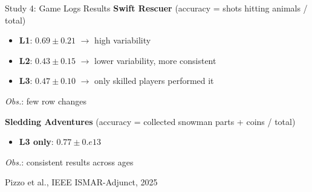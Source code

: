 \documentclass[aspectratio=169, 12pt]{beamer}
\newcommand{\citefooter}[1]{\hfill{\tiny #1}}
\begin{document}
\begin{frame}{Study 4: Game Logs Results}
	\textbf{\textcolor{gbAqua}{Swift Rescuer}} (accuracy = shots hitting animals / total)
	
	\begin{itemize}
		\item \textbf{L1}: $0.69 \pm 0.21$ $\rightarrow$ high variability
		\item \textbf{L2}: $0.43 \pm 0.15$ $\rightarrow$ lower variability, more consistent
		\item \textbf{L3}: $0.47 \pm 0.10$ $\rightarrow$ only skilled players performed it
	\end{itemize}
	\textit{Obs.}: few row changes
	
	\vspace{0.3cm}
	
	\textbf{\textcolor{gbAqua}{Sledding Adventures}} (accuracy = collected snowman parts + coins / total)
	
	\begin{itemize}
		\item \textbf{L3 only}: $0.77 \pm 0.e13$
	\end{itemize}
	\textit{Obs.}: consistent results across ages
	
	\citefooter{Pizzo et al., IEEE ISMAR-Adjunct, 2025}
\end{frame}
\end{document}
